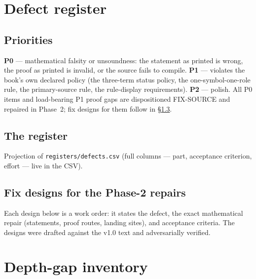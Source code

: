 \documentclass[11pt,letterpaper]{article}
\begin{document}
\section{Defect register}
\label{sec:defects}

\subsection{Priorities}
\textbf{P0} --- mathematical falsity or unsoundness: the statement as
printed is wrong, the proof as printed is invalid, or the source fails
to compile.  \textbf{P1} --- violates the book's own declared policy
(the three-term status policy, the one-symbol-one-role rule, the
primary-source rule, the rule-display requirements).  \textbf{P2} ---
polish.  All P0 items and load-bearing P1 proof gaps are dispositioned
FIX-SOURCE and repaired in Phase~2; fix designs for them follow in
§\ref{sec:fixdesigns}.

\subsection{The register}
Projection of \texttt{registers/defects.csv} (full columns --- part,
acceptance criterion, effort --- live in the CSV).



\subsection{Fix designs for the Phase-2 repairs}
\label{sec:fixdesigns}

Each design below is a work order: it states the defect, the exact
mathematical repair (statements, proof routes, landing sites), and
acceptance criteria.  The designs were drafted against the v1.0 text and
adversarially verified.

\begingroup\let\texttt\spectt




\endgroup

\section{Depth-gap inventory}
\label{sec:depth}
\end{document}
